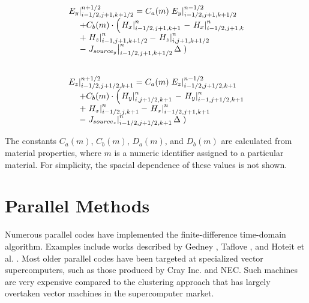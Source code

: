 \documentclass{acesconference}
\begin{document}
\begin{equation}
  \label{eq:approxEy}
  \begin{array}{ll}
    \hspace{0.15cm} & \\
    \multicolumn{2}{l}{\left.  E_y \right|^{n+1/2}_{i-1/2,j+1,k+1/2} 
      = C_a(m) \left. E_y \right|^{n-1/2}_{i-1/2,j+1,k+1/2}} \\
    & + C_b(m) \cdot \left( \left. H_x \right|^{n}_{i-1/2,j+1,k+1} \right.
    - \left. H_x \right|^{n}_{i-1/2,j+1,k} \\
    & + \left. H_z \right|^{n}_{i-1,j+1,k+1/2} 
    - \left. H_z \right|^{n}_{i,j+1,k+1/2} \\
    & - \left. J_{source_y} \right|^{n}_{i-1/2,j+1,k+1/2} \Delta
    \left. \right)  

  \end{array}
\end{equation}

\begin{equation}
  \label{eq:approxEz}
  \begin{array}{ll}
    \hspace{0.15cm} & \\
    \multicolumn{2}{l}{\left.  E_z \right|^{n+1/2}_{i-1/2,j+1/2,k+1} 
      = C_a(m) \left. E_z \right|^{n-1/2}_{i-1/2,j+1/2,k+1}} \\
    & + C_b(m) \cdot \left( \left. H_y \right|^{n}_{i,j+1/2,k+1} \right.
    - \left. H_y \right|^{n}_{i-1,j+1/2,k+1} \\
    & + \left. H_x \right|^{n}_{i-1/2,j,k+1} 
    - \left. H_x \right|^{n}_{i-1/2,j+1,k+1} \\
    & - \left. J_{source_z} \right|^{n}_{i-1/2,j+1/2,k+1} \Delta
    \left.\right)    
  \end{array}
\end{equation}

%  

The constants $C_a(m)$, $C_b(m)$, $D_a(m)$, and $D_b(m)$ are calculated from
material properties, where $m$ is a numeric identifier assigned to a
particular material. For simplicity, the spacial dependence of these
values is not shown. 

\section{Parallel Methods}
Numerous parallel codes have implemented the finite-difference
time-domain algorithm. Examples include works described by Gedney
\cite{gedney1995}, Taflove \cite{taflove????}, and Hoteit et al.
\cite{hoteit1999}. Most older parallel codes have been targeted at
specialized vector supercomputers, such as those produced by Cray Inc.
and NEC. Such machines are very expensive compared to the clustering
approach \cite{becker1995} that has largely overtaken vector machines
in the supercomputer market.
\end{document}
